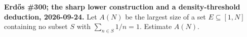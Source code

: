 \textbf{Erd\H{o}s \#300; the sharp lower construction and a density-threshold deduction, 2026-09-24.}
Let $A(N)$ be the largest size of a set $E\subseteq[1,N]$ containing no subset $S$ with $\sum_{n\in S}1/n=1$. Estimate $A(N)$.

